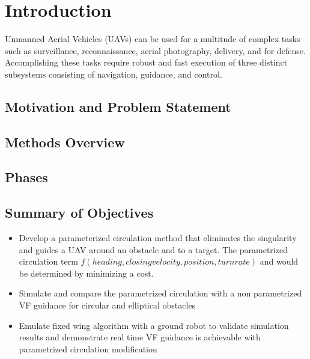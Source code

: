 \documentclass[numbered,pdftex]{ohio-etd}
\begin{document}


\chapter{Introduction}

Unmanned Aerial Vehicles (UAVs) can be used for a multitude of complex tasks such as surveillance, reconnaissance, aerial photography, delivery, and for defense. Accomplishing these tasks require robust and fast execution of three distinct subsystems consisting of navigation, guidance, and control. 
\section{Motivation and Problem Statement}


\section{Methods Overview}
\section{Phases}
\section{Summary of Objectives}
\begin{itemize}

\item Develop a parameterized circulation method that eliminates the singularity and guides a UAV around an obstacle and to a target. The parametrized circulation term $f(heading,closing velocity, position, turn rate)$ and would be determined by minimizing a cost.


\item Simulate and compare the parametrized circulation with a non parametrized VF guidance for circular and elliptical obstacles

\item Emulate fixed wing algorithm with a ground robot to validate simulation results and demonstrate real time VF guidance is achievable with parametrized circulation modification


\end{itemize}
\end{document}
